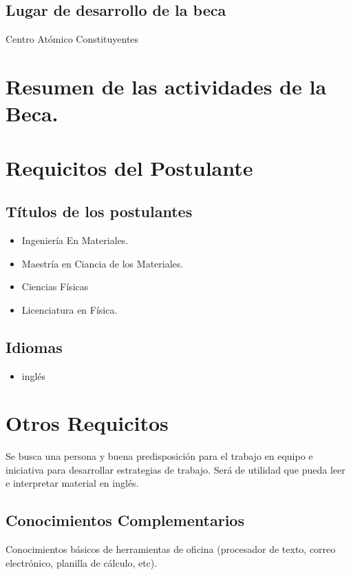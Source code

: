 \subsection{Lugar de desarrollo de la beca}
Centro Atómico Constituyentes

\section{Resumen de las actividades de la Beca.}




\section{Requicitos del Postulante}

\subsection{Títulos de los postulantes}

\begin{itemize}
    \item Ingeniería En Materiales.

    \item Maestría en Ciancia de los Materiales.

    \item Ciencias Físicas

    \item Licenciatura en Física.

\end{itemize}

\subsection{Idiomas}

\begin{itemize}
    \item inglés
\end{itemize}

\section{Otros Requicitos}

Se busca una persona y buena predisposición para el trabajo
en equipo e iniciativa para desarrollar estrategias de 
trabajo. Será de utilidad que pueda leer e interpretar
material en inglés.  

\subsection{Conocimientos Complementarios}

Conocimientos básicos de herramientas de oficina (procesador de texto,
correo electrónico, planilla de cálculo, etc).
